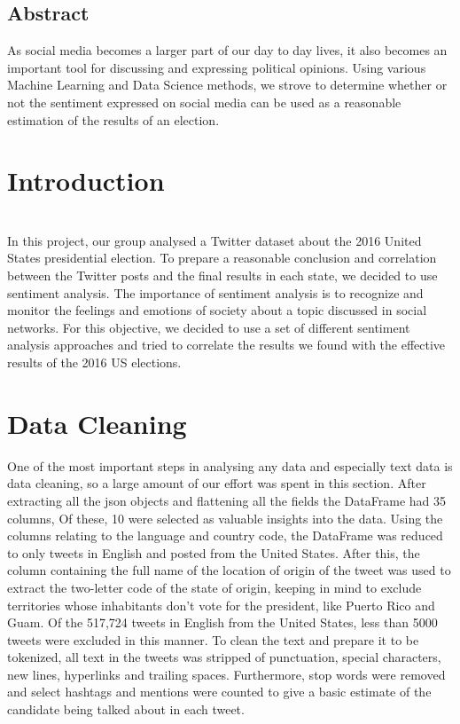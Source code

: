 \documentclass{article}
\begin{document}
\begin{titlepage}
    \setcounter{section}{0}
    \setcounter{figure}{0}
    \section*{Abstract}
    \indent As social media becomes a larger part of our day to day lives, it
    also becomes an important tool for discussing and expressing
    political opinions. Using various Machine Learning and Data Science
    methods, we strove to determine whether or not the sentiment
    expressed on social media can be used as a reasonable estimation of
    the results of an election. 
  \end{titlepage}

  \setcounter{page}{1}
  
  \section{Introduction}\\
  \indent In this project, our group analysed a Twitter dataset about the 2016
  United States presidential election. To prepare a reasonable
  conclusion and correlation between the Twitter posts and the final
  results in each state, we decided to use sentiment analysis. The
  importance of sentiment analysis is to recognize and monitor the
  feelings and emotions of society about a topic discussed in social
  networks. For this objective, we decided to use a set of different
  sentiment analysis approaches and tried to correlate the results we
  found with the effective results of the 2016 US elections. 
  
  \section{Data Cleaning}
  \indent One of the most important steps in analysing any data and especially
  text data is data cleaning, so a large amount of our effort was
  spent in this section. After extracting all the json objects and
  flattening all the fields the DataFrame had 35 columns, Of these, 10
  were selected as valuable insights into the data. Using the columns
  relating to the language and country code, the DataFrame was reduced
  to only tweets in English and posted from the United States. After
  this, the column containing the full name of the location of origin
  of the tweet was used to extract the two-letter code of the state of
  origin, keeping in mind to exclude territories whose inhabitants
  don’t vote for the president, like Puerto Rico and Guam. Of the
  517,724 tweets in English from the United States, less than 5000
  tweets were excluded in this manner. To clean the text and prepare
  it to be tokenized, all text in the tweets was stripped of
  punctuation, special characters, new lines, hyperlinks and trailing
  spaces. Furthermore, stop words were removed and select hashtags and
  mentions were counted to give a basic estimate of the candidate
  being talked about in each tweet. 
\end{document}
